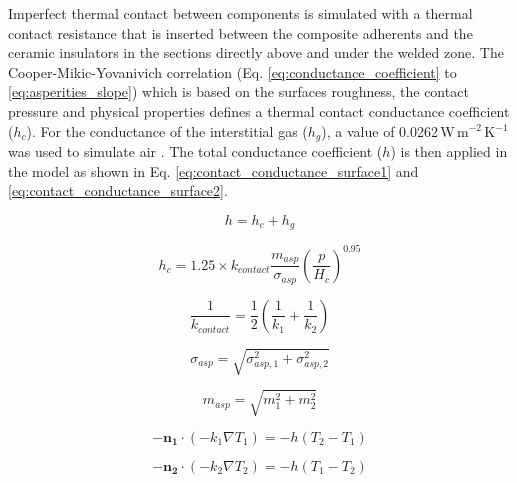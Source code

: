 Imperfect thermal contact between components is simulated with a thermal contact resistance that is inserted between the composite adherents and the ceramic insulators in the sections directly above and under the welded zone. 
The Cooper-Mikic-Yovanivich correlation \cite{Cooper1969} (Eq. \ref{eq:conductance_coefficient} to \ref{eq:asperities_slope}) which is based on the surfaces roughness, the contact pressure and physical properties defines a thermal contact conductance coefficient ($h_c$). 
For the conductance of the interstitial gas ($h_g$), a value of \mbox{0.0262\,W\,m$^{-2}$\,K$^{-1}$} was used to simulate air \cite{rumble2019crc}. 
The total conductance coefficient ($h$) is then applied in the model as shown in Eq. \ref{eq:contact_conductance_surface1} and \ref{eq:contact_conductance_surface2}. 

\begin{equation}
h = h_c + h_g
\label{eq:conductance_coefficient}
\end{equation}

\begin{equation}
h_c = 1.25 \times k_{contact} \frac{m_{asp}}{\sigma_{asp}} \left( \frac{p}{H_c} \right)^{0.95}
\label{eq:cmy_correlation}
\end{equation}

\begin{equation}
\frac{1}{k_{contact}} = \frac{1}{2} \left( \frac{1}{k_1} + \frac{1}{k_2} \right)
\label{eq:contact_conductivity}
\end{equation}

\begin{equation}
\sigma_{asp} = \sqrt{\sigma_{asp,1}^2 + \sigma_{asp,2}^2}
\label{eq:asperities_average_height}
\end{equation}

\begin{equation}
m_{asp} = \sqrt{m_1^2 + m_2^2}
\label{eq:asperities_slope}
\end{equation}

\begin{equation}
-\mathbf{n_1} \cdot \left( -k_1 \nabla T_1 \right) = -h \left( T_2 -T_1 \right)
\label{eq:contact_conductance_surface1}
\end{equation}

\begin{equation}
-\mathbf{n_2} \cdot \left( -k_2 \nabla T_2 \right) = -h \left( T_1 -T_2 \right)
\label{eq:contact_conductance_surface2}
\end{equation}

